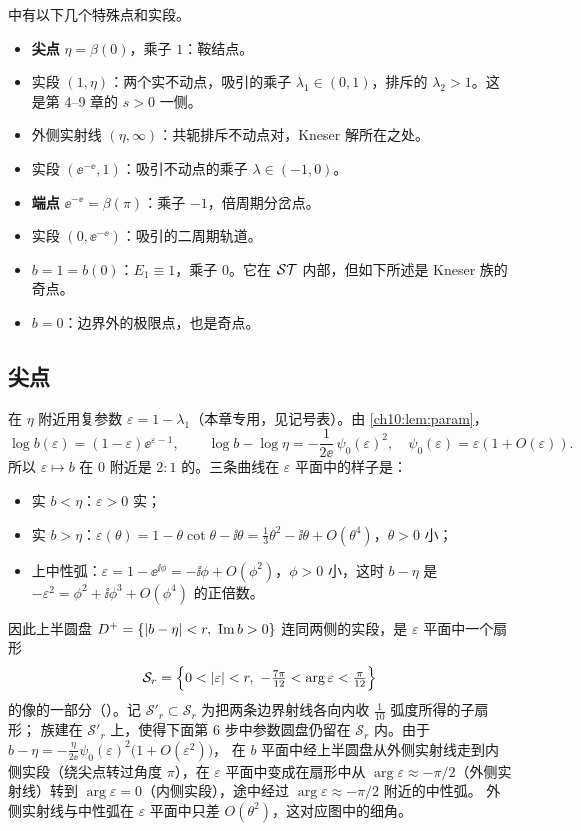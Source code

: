  中有以下几个特殊点和实段。
\begin{itemize}
\item \textbf{尖点} $\eta=\beta(0)$，乘子 $1$：鞍结点。
\item 实段 $(1,\eta)$：两个实不动点，吸引的乘子 $\lambda_1\in(0,1)$，排斥的 $\lambda_2>1$。这是第 4--9 章的 $s>0$ 一侧。
\item 外侧实射线 $(\eta,\infty)$：共轭排斥不动点对，Kneser 解所在之处。
\item 实段 $(\ee^{-\ee},1)$：吸引不动点的乘子 $\lambda\in(-1,0)$。
\item \textbf{端点} $\ee^{-\ee}=\beta(\pi)$：乘子 $-1$，倍周期分岔点。
\item 实段 $(0,\ee^{-\ee})$：吸引的二周期轨道。
\item $b=1=b(0)$：$E_1\equiv1$，乘子 $0$。它在 $\mathcal{ST}$ 内部，但如下所述是 Kneser 族的奇点。
\item $b=0$：边界外的极限点，也是奇点。
\end{itemize}

\subsection{尖点}

在 $\eta$ 附近用复参数 $\varepsilon=1-\lambda_1$（本章专用，见记号表）。由 \cref{ch10:lem:param}，
\begin{equation}\label{ch10:eq:cusp-param}
  \log b(\varepsilon)=(1-\varepsilon)\ee^{\varepsilon-1},\qquad
  \log b-\log\eta=-\frac{1}{2\ee}\,\psi_0(\varepsilon)^2,\quad \psi_0(\varepsilon)=\varepsilon(1+O(\varepsilon)) .
\end{equation}
所以 $\varepsilon\mapsto b$ 在 $0$ 附近是 $2:1$ 的。三条曲线在 $\varepsilon$ 平面中的样子是：
\begin{itemize}
\item 实 $b<\eta$：$\varepsilon>0$ 实；
\item 实 $b>\eta$：$\varepsilon(\theta)=1-\theta\cot\theta-\ii\theta=\tfrac13\theta^2-\ii\theta+O(\theta^4)$，$\theta>0$ 小；
\item 上中性弧：$\varepsilon=1-\ee^{\ii\phi}=-\ii\phi+O(\phi^2)$，$\phi>0$ 小，这时 $b-\eta$ 是 $-\varepsilon^2=\phi^2+\ii\phi^3+O(\phi^4)$ 的正倍数。
\end{itemize}
因此上半圆盘 $D^+=\{|b-\eta|<r,\ \operatorname{Im} b>0\}$ 连同两侧的实段，是 $\varepsilon$ 平面中一个扇形
\[
  \mathcal S_r=\Bigl\{0<|\varepsilon|<r,\ -\tfrac{7\pi}{12}<\arg\varepsilon<\tfrac{\pi}{12}\Bigr\}
\]
的像的一部分（\cite[引理~10.1]{KneserPaper}）。记 $\mathcal S'_r\subset\mathcal S_r$ 为把两条边界射线各向内收 $\tfrac1{10}$ 弧度所得的子扇形；
族建在 $\mathcal S'_r$ 上，使得下面第 6 步中参数圆盘仍留在 $\mathcal S_r$ 内。由于 $b-\eta=-\frac{\eta}{2\ee}\psi_0(\varepsilon)^2\bigl(1+O(\varepsilon^2)\bigr)$，
在 $b$ 平面中经上半圆盘从外侧实射线走到内侧实段（绕尖点转过角度 $\pi$），在 $\varepsilon$ 平面中变成在扇形中从
$\arg\varepsilon\approx-\pi/2$（外侧实射线）转到 $\arg\varepsilon=0$（内侧实段），途中经过 $\arg\varepsilon\approx-\pi/2$ 附近的中性弧。
外侧实射线与中性弧在 $\varepsilon$ 平面中只差 $O(\theta^2)$，这对应图中的细角。

